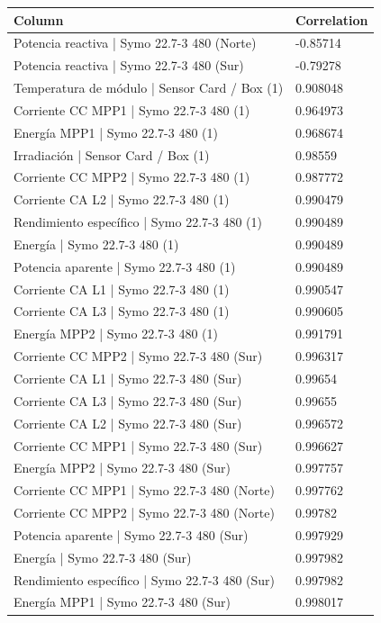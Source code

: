 \documentclass[a4paper,12pt]{article}
\begin{document}
\begin{table}[H]
\centering
\begin{tabular}{ll}
\toprule
\textbf{Column} & \textbf{Correlation} \\
\midrule
Potencia reactiva | Symo 22.7-3 480 (Norte) & -0.85714 \\
Potencia reactiva | Symo 22.7-3 480 (Sur) & -0.79278 \\
Temperatura de módulo | Sensor Card / Box (1) & 0.908048 \\
Corriente CC MPP1 | Symo 22.7-3 480 (1) & 0.964973 \\
Energía MPP1 | Symo 22.7-3 480 (1) & 0.968674 \\
Irradiación | Sensor Card / Box (1) & 0.98559 \\
Corriente CC MPP2 | Symo 22.7-3 480 (1) & 0.987772 \\
Corriente CA L2 | Symo 22.7-3 480 (1) & 0.990479 \\
Rendimiento específico | Symo 22.7-3 480 (1) & 0.990489 \\
Energía | Symo 22.7-3 480 (1) & 0.990489 \\
Potencia aparente | Symo 22.7-3 480 (1) & 0.990489 \\
Corriente CA L1 | Symo 22.7-3 480 (1) & 0.990547 \\
Corriente CA L3 | Symo 22.7-3 480 (1) & 0.990605 \\
Energía MPP2 | Symo 22.7-3 480 (1) & 0.991791 \\
Corriente CC MPP2 | Symo 22.7-3 480 (Sur) & 0.996317 \\
Corriente CA L1 | Symo 22.7-3 480 (Sur) & 0.99654 \\
Corriente CA L3 | Symo 22.7-3 480 (Sur) & 0.99655 \\
Corriente CA L2 | Symo 22.7-3 480 (Sur) & 0.996572 \\
Corriente CC MPP1 | Symo 22.7-3 480 (Sur) & 0.996627 \\
Energía MPP2 | Symo 22.7-3 480 (Sur) & 0.997757 \\
Corriente CC MPP1 | Symo 22.7-3 480 (Norte) & 0.997762 \\
Corriente CC MPP2 | Symo 22.7-3 480 (Norte) & 0.99782 \\
Potencia aparente | Symo 22.7-3 480 (Sur) & 0.997929 \\
Energía | Symo 22.7-3 480 (Sur) & 0.997982 \\
Rendimiento específico | Symo 22.7-3 480 (Sur) & 0.997982 \\
Energía MPP1 | Symo 22.7-3 480 (Sur) & 0.998017 \\

\end{tabular}
\end{table}
\end{document}
